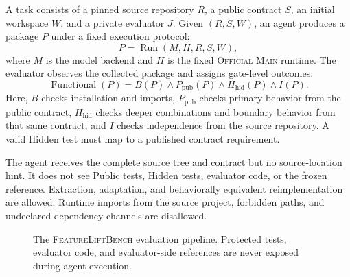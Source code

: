 \documentclass[acmsmall,anonymous,review,screen]{acmart}
\newcommand{\flb}{\textsc{FeatureLiftBench}\xspace}
\newcommand{\mainprotocol}{\textsc{Official Main}\xspace}
\begin{document}
A task consists of a pinned source repository $R$, a public contract $S$, an
initial workspace $W$, and a private evaluator $J$. Given $(R,S,W)$, an agent
produces a package $P$ under a fixed execution protocol:
\begin{equation}
  P = \operatorname{Run}(M, H, R, S, W),
  \label{eq:run}
\end{equation}
where $M$ is the model backend and $H$ is the fixed \mainprotocol runtime. The
evaluator observes the collected package and assigns gate-level outcomes:
\begin{equation}
  \operatorname{Functional}(P)
  = B(P) \land P_{\mathrm{pub}}(P)
    \land H_{\mathrm{hid}}(P) \land I(P).
  \label{eq:functional}
\end{equation}
Here, $B$ checks installation and imports, $P_{\mathrm{pub}}$ checks primary
behavior from the public contract, $H_{\mathrm{hid}}$ checks deeper
combinations and boundary behavior from that same contract, and $I$ checks
independence from the source repository. A valid Hidden test must map to a
published contract requirement.

The agent receives the complete source tree and contract but no source-location
hint. It does not see Public tests, Hidden tests, evaluator code, or the frozen
reference. Extraction, adaptation, and behaviorally equivalent reimplementation
are allowed. Runtime imports from the source project, forbidden paths, and
undeclared dependency channels are disallowed.

\begin{figure}[t]
  \centering
  \caption{The \flb evaluation pipeline. Protected tests, evaluator code, and
  evaluator-side references are never exposed during agent execution.}
  \label{fig:pipeline}
\end{figure}
\end{document}

